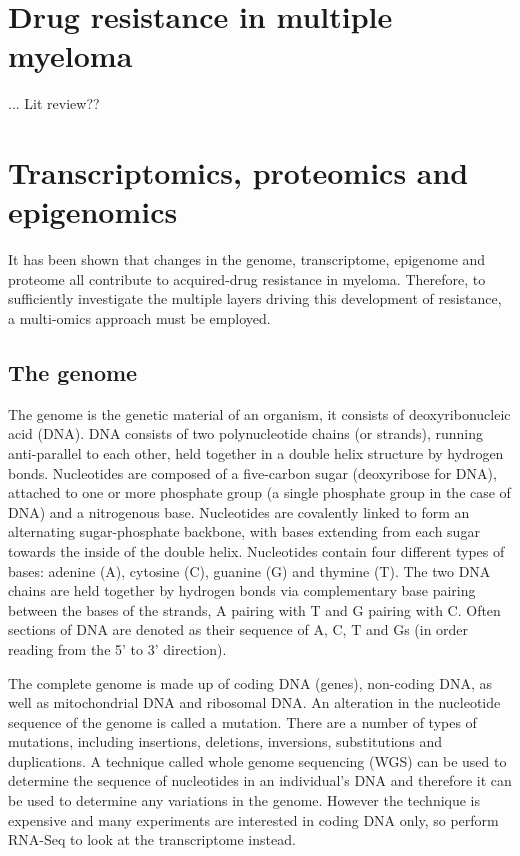 \section{Drug resistance in multiple myeloma}
...
Lit review??


\section{Transcriptomics, proteomics and epigenomics}
It has been shown that changes in the genome, transcriptome, epigenome and proteome all contribute to acquired-drug resistance in myeloma.
Therefore, to sufficiently investigate the multiple layers driving this development of resistance, a multi-omics approach must be employed.

\subsection{The genome}
The genome is the genetic material of an organism, it consists of deoxyribonucleic acid (DNA).
DNA consists of two polynucleotide chains (or strands), running anti-parallel to each other, held together in a double helix structure by hydrogen bonds.
Nucleotides are composed of a five-carbon sugar (deoxyribose for DNA), attached to one or more phosphate group (a single phosphate group in the case of DNA) and a nitrogenous base.
Nucleotides are covalently linked to form an alternating sugar-phosphate backbone, with bases extending from each sugar towards the inside of the double helix.
Nucleotides contain four different types of bases: adenine (A), cytosine (C), guanine (G) and thymine (T).
The two DNA chains are held together by hydrogen bonds via complementary base pairing between the bases of the strands, A pairing with T and G pairing with C\@.
Often sections of DNA are denoted as their sequence of A, C, T and Gs (in order reading from the 5' to 3' direction).

The complete genome is made up of coding DNA (genes), non-coding DNA, as well as mitochondrial DNA and ribosomal DNA.
An alteration in the nucleotide sequence of the genome is called a mutation.
There are a number of types of mutations, including insertions, deletions, inversions, substitutions and duplications.
A technique called whole genome sequencing (WGS) can be used to determine the sequence of nucleotides in an individual's DNA and therefore it can be used to determine any variations in the genome.
However the technique is expensive and many experiments are interested in coding DNA only, so perform RNA-Seq to look at the transcriptome instead.

